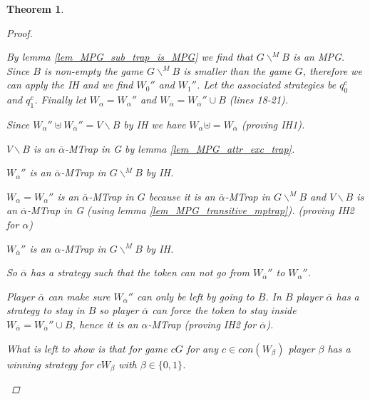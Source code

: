 \documentclass[]{article}
\newtheorem{theorem}{Theorem}[section]
\begin{document}
\begin{theorem}
\begin{proof}
\begin{itemize}
			By lemma \ref{lem_MPG_sub_trap_is_MPG} we find that $G\backslash^{\!\!M}B$ is an MPG. Since $B$ is non-empty the game $G\backslash^{\!\!M}B$ is smaller than the game $G$, therefore we can apply the IH and we find $W_0''$ and $W_1''$. Let the associated strategies be $q_0^c$ and $q_1^c$. Finally let $W_\alpha = W_\alpha''$ and $W_{\overline{\alpha}} = W_{\overline{\alpha}}'' \cup B$ (lines 18-21).
			
			Since $W_\alpha'' \uplus W_{\overline{\alpha}}'' = V\backslash B$ by IH we have $W_\alpha \uplus = W_{\overline{\alpha}}$ (proving IH1).
			
			
			$V \backslash B$ is an $\overline{\alpha}$-MTrap in G by lemma \ref{lem_MPG_attr_exc_trap}.
			
			$W_\alpha''$ is an $\overline{\alpha}$-MTrap in $G\backslash^{\!\!M}B$ by IH.
			
			$W_\alpha = W_\alpha''$ is an $\overline{\alpha}$-MTrap in $G$ because it is an $\overline{\alpha}$-MTrap in $G\backslash^{\!\!M}B$ and $V \backslash B$ is an $\overline{\alpha}$-MTrap in G (using lemma \ref{lem_MPG_transitive_mptrap}). (proving IH2 for $\alpha$)
			
			$W_{\overline{\alpha}}''$ is an $\alpha$-MTrap in $G\backslash^{\!\!M}B$ by IH.
			
			So $\overline{\alpha}$ has a strategy such that the token can not go from $W_{\overline{\alpha}}''$ to $W_\alpha''$. 
			
			Player $\overline{\alpha}$ can make sure $W_{\overline{\alpha}}''$ can only be left by going to $B$. In $B$ player $\overline{\alpha}$ has a strategy to stay in $B$ so player $\overline{\alpha}$ can force the token to stay inside $W_{\overline{\alpha}} = W_{\overline{\alpha}}'' \cup B$, hence it is an $\alpha$-MTrap (proving IH2 for $\overline{\alpha}$).
			
			What is left to show is that for game $cG$ for any $c \in con(W_\beta)$ player $\beta$ has a winning strategy for $cW_\beta$ with $\beta \in \{0,1\}$.
			

\end{itemize}
\end{proof}
\end{theorem}
\end{document}
